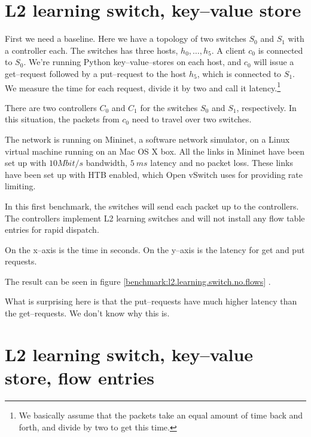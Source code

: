 
\section{L2 learning switch, key--value store}
\label{chapter:benchmark.l2.kv.noflows}

First we need a baseline.  Here we have a topology of two switches $S_0$ and
$S_1$ with a controller each.  The switches has three hosts, $h_0, \dots, h_5$.
A client $c_0$ is connected to $S_0$. We're running Python
key--value--stores on each host, and $c_0$ will issue a get--request
followed by a put--request to the host $h_5$, which is connected to $S_1$.
We measure the time for each request, divide it
by two and call it latency.\footnote{We basically assume that the packets
take an equal amount of time back and forth, and divide by two to get this
time.}

There are two controllers $C_0$ and $C_1$ for the switches $S_0$ and $S_1$,
respectively.  In this situation, the packets from $c_0$ need to travel
over two switches.

The network is running on Mininet, a software network simulator, on a Linux
virtual machine running on an Mac OS X box.  All the links in Mininet have
been set up with $10 Mbit/s$ bandwidth, $5~ms$ latency and no packet
loss.  These links have been set up with \ac{HTB}
\cite{devera2002hierarchical} enabled, which Open vSwitch
 uses for providing rate limiting.

In this first benchmark, the switches will send each packet up to the
controllers.  The controllers implement L2 learning switches and will not
install any flow table entries for rapid dispatch.

On the x--axis is the time in seconds.  On the y--axis is the latency for
get and put requests.

The result can be seen in figure \ref{benchmark:l2.learning.switch.no.flows} 
.

What is surprising here is that the put--requests have much higher latency
than the get--requests. We don't know why this is.

\section{L2 learning switch, key--value store, flow entries}

